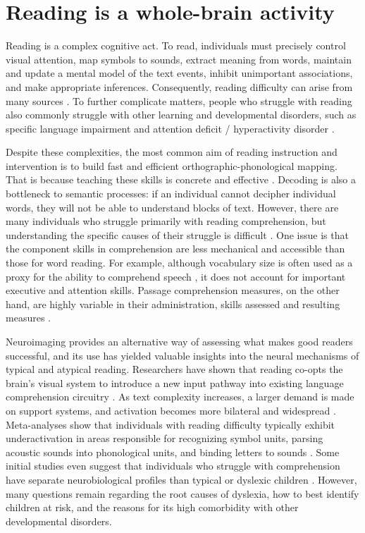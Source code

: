 \section{Reading is a whole-brain activity}

Reading is a complex cognitive act. To read, individuals must precisely control visual attention, map symbols to sounds, extract meaning from words, maintain and update a mental model of the text events, inhibit unimportant associations, and make appropriate inferences. Consequently, reading difficulty can arise from many sources \citep{Pennington2009, vanderLely2010}. To further complicate matters, people who struggle with reading also commonly struggle with other learning and developmental disorders, such as specific language impairment and attention deficit / hyperactivity disorder \citep{Pennington2006, Margari2013}.

Despite these complexities, the most common aim of reading instruction and intervention is to build fast and efficient orthographic-phonological mapping. That is because teaching these skills is concrete and effective \citep{NationalReadingPanel2000}. Decoding is also a bottleneck to semantic processes: if an individual cannot decipher individual words, they will not be able to understand blocks of text. However, there are many individuals who struggle primarily with reading comprehension, but understanding the specific causes of their struggle is difficult \citep{Cain2006}. One issue is that the component skills in comprehension are less mechanical and accessible than those for word reading. For example, although vocabulary size is often used as a proxy for the ability to comprehend speech \citep{Spencer2014}, it does not account for important executive and attention skills. Passage comprehension measures, on the other hand, are highly variable in their administration, skills assessed and resulting measures \citep{Cutting2009a}.

Neuroimaging provides an alternative way of assessing what makes good readers successful, and its use has yielded valuable insights into the neural mechanisms of typical and atypical reading. Researchers have shown that reading co-opts the brain's visual system to introduce a new input pathway into existing language comprehension circuitry \citep{Jobard2007}. As text complexity increases, a larger demand is made on support systems, and activation becomes more bilateral and widespread \citep{Xu2005}.  Meta-analyses show that individuals with reading difficulty typically exhibit underactivation in areas responsible for recognizing symbol units, parsing acoustic sounds into phonological units, and binding letters to sounds \citep{Maisog2008, Richlan2009, Paulesu2014}. Some initial studies even suggest that individuals who struggle with comprehension have separate neurobiological profiles than typical or dyslexic children \cite{Bailey2016}. However, many questions remain regarding the root causes of dyslexia, how to best identify children at risk, and the reasons for its high comorbidity with other developmental disorders. 

